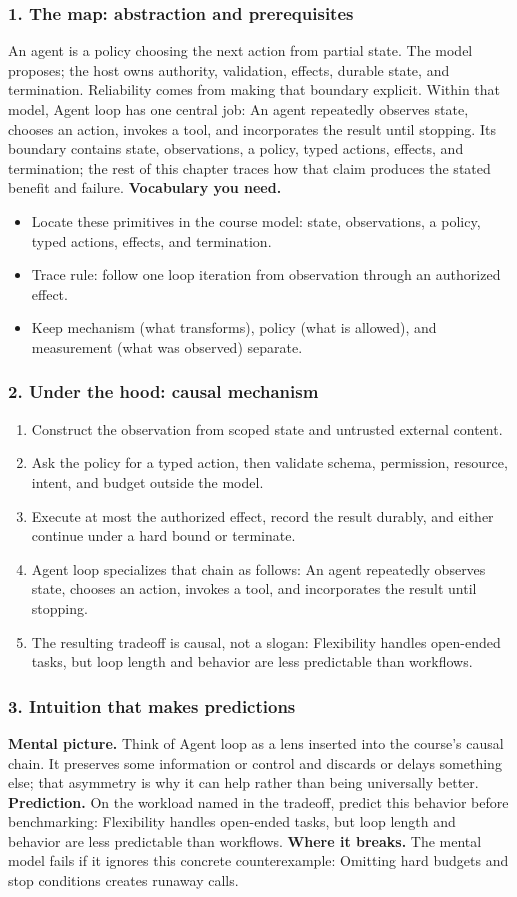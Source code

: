 \subsubsection*{1. The map: abstraction and prerequisites}
An agent is a policy choosing the next action from partial state. The model proposes; the host owns authority, validation, effects, durable state, and termination. Reliability comes from making that boundary explicit.
Within that model, Agent loop has one central job: An agent repeatedly observes state, chooses an action, invokes a tool, and incorporates the result until stopping. Its boundary contains state, observations, a policy, typed actions, effects, and termination; the rest of this chapter traces how that claim produces the stated benefit and failure.
\textbf{Vocabulary you need.}\begin{itemize}
\item Locate these primitives in the course model: state, observations, a policy, typed actions, effects, and termination.
\item Trace rule: follow one loop iteration from observation through an authorized effect.
\item Keep mechanism (what transforms), policy (what is allowed), and measurement (what was observed) separate.
\end{itemize}
\subsubsection*{2. Under the hood: causal mechanism}\begin{enumerate}
\item Construct the observation from scoped state and untrusted external content.
\item Ask the policy for a typed action, then validate schema, permission, resource, intent, and budget outside the model.
\item Execute at most the authorized effect, record the result durably, and either continue under a hard bound or terminate.
\item Agent loop specializes that chain as follows: An agent repeatedly observes state, chooses an action, invokes a tool, and incorporates the result until stopping.
\item The resulting tradeoff is causal, not a slogan: Flexibility handles open-ended tasks, but loop length and behavior are less predictable than workflows.
\end{enumerate}
\subsubsection*{3. Intuition that makes predictions}
\textbf{Mental picture.} Think of Agent loop as a lens inserted into the course's causal chain. It preserves some information or control and discards or delays something else; that asymmetry is why it can help rather than being universally better.
\textbf{Prediction.} On the workload named in the tradeoff, predict this behavior before benchmarking: Flexibility handles open-ended tasks, but loop length and behavior are less predictable than workflows.
\textbf{Where it breaks.} The mental model fails if it ignores this concrete counterexample: Omitting hard budgets and stop conditions creates runaway calls.

